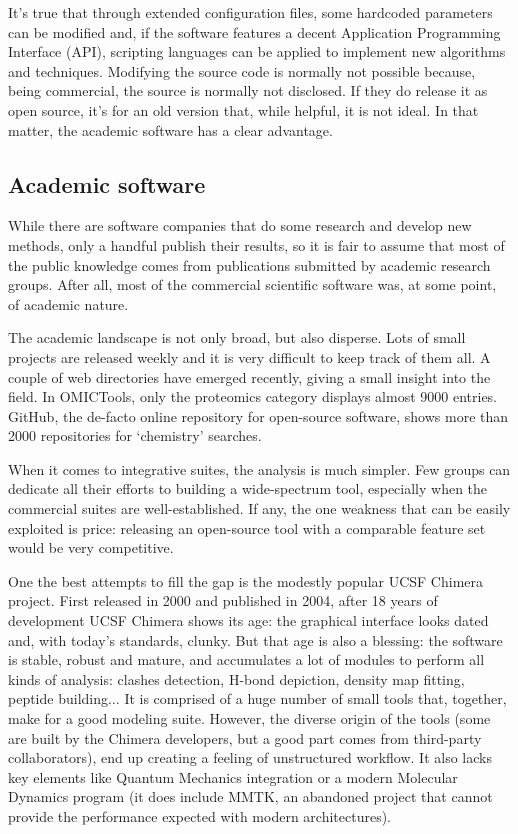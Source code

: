 It’s true that through extended configuration files, some hardcoded parameters can be modified and, if the software features a decent Application Programming Interface (API), scripting languages can be applied to implement new algorithms and techniques. Modifying the source code is normally not possible because, being commercial, the source is normally not disclosed. If they do release it as open source, it’s for an old version that, while helpful, it is not ideal.\cite{delano2002pymol} In that matter, the academic software has a clear advantage.

\subsection{Academic software}
While there are software companies that do some research and develop new methods, only a handful publish their results, so it is fair to assume that most of the public knowledge comes from publications submitted by academic research groups. After all, most of the commercial scientific software was, at some point, of academic nature.\cite{gaussian,schrodingerpymol}

The academic landscape is not only broad, but also disperse. Lots of small projects are released weekly and it is very difficult to keep track of them all. A couple of web directories have emerged recently,\cite{omictools,pirhadi2016open} giving a small insight into the field. In OMICTools, only the proteomics category displays almost 9000 entries. GitHub,\cite{github} the de-facto online repository for open-source software, shows more than 2000 repositories for ‘chemistry’ searches.

When it comes to integrative suites, the analysis is much simpler. Few groups can dedicate all their efforts to building a wide-spectrum tool, especially when the commercial suites are well-established. If any, the one weakness that can be easily exploited is price: releasing an open-source tool with a comparable feature set would be very competitive.

One the best attempts to fill the gap is the modestly popular UCSF Chimera project. First released in 2000\cite{firstchimera} and published in 2004,\cite{chimera} after 18 years of development UCSF Chimera shows its age: the graphical interface looks dated and, with today’s standards, clunky. But that age is also a blessing: the software is stable, robust and mature, and accumulates a lot of modules to perform all kinds of analysis: clashes detection, H-bond depiction, density map fitting, peptide building$ \ldots $  It is comprised of a huge number of small tools that, together, make for a good modeling suite. However, the diverse origin of the tools (some are built by the Chimera developers, but a good part comes from third-party collaborators), end up creating a feeling of unstructured workflow. It also lacks key elements like Quantum Mechanics integration or a modern Molecular Dynamics program (it does include MMTK, an abandoned project that cannot provide the performance expected with modern architectures).

